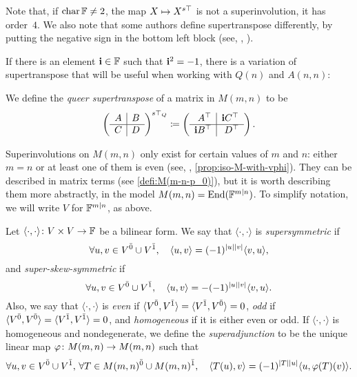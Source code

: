 Note that, if $\operatorname{char} \mathbb{F} \neq 2$, the map $X \mapsto X^{s\top}$ is not a superinvolution, it has order~$4$. 
We also note that some authors define supertranspose differently, by putting the negative sign in the bottom left block (see, \eg, \cite[Subsection 1.1.2]{MR3012224}). 

If there is an element $\mathbf{i}\in \mathbb{F}$ such that $\mathbf{i}^2 = -1$, there is a variation of supertranspose that will be useful when working with $Q(n)$ and $A(n,n)$:

\begin{defi}\label{def:queer-stp}
    We define the \emph{queer supertranspose} of a matrix in $M(m,n)$ to be
    \[
        \left(\begin{array}{c|c}
            A & B\\
            \hline
            C & D
        \end{array}\right)\sTq \coloneqq
        \left(\begin{array}{c|c}
            \phantom{\bi}A\transp & \bi C\transp\\
            \hline
            \bi B\transp & \phantom{\bi} D\transp
        \end{array}\right).
    \]
\end{defi}

Superinvolutions on $M(m,n)$ only exist for certain values of $m$ and $n$: either $m=n$ or at least one of them is even (see, \eg, \cref{prop:iso-M-with-vphi}). 
They can be described in matrix terms (see \cref{defi:M(m-n-p_0)}), but it is worth describing them more abstractly, in the model $M(m,n) = \operatorname{End}(\mathbb{F}^{m|n})$. 
To simplify notation, we will write $V$ for $\mathbb{F}^{m|n}$, as above. 

\begin{defi}
Let $\langle \cdot, \cdot \rangle \colon V\times V \to \mathbb{F}$ be a bilinear form. 
We say that $\langle \cdot, \cdot \rangle$ is  \emph{supersymmetric} if
\[
    \forall u,v \in V^{\bar0} \cup V^{\bar1}, \quad \langle u, v \rangle 
    = (-1)^{|u||v|} \langle v, u \rangle,
\]
and \emph{super-skew-symmetric} if
\[
    \forall u,v \in V^{\bar0} \cup V^{\bar1}, \quad \langle u, v \rangle 
    = -(-1)^{|u||v|} \langle v, u \rangle.
\]
Also, we say that $\langle \cdot, \cdot \rangle$ is \emph{even} if $\langle V^{\bar0}, V^{\bar1} \rangle = \langle V^{\bar1}, V^{\bar0} \rangle = 0$, \emph{odd} if $\langle V^{\bar0}, V^{\bar0} \rangle = \langle V^{\bar1}, V^{\bar1} \rangle = 0$, and \emph{homogeneous} if it is either even or odd. 
If $\langle \cdot, \cdot \rangle$ is homogeneous and nondegenerate, we define the \emph{superadjunction} to be the unique linear map $\varphi\colon M(m,n) \to M(m,n)$ such that 
\[
    \forall u,v \in V^{\bar0} \cup V^{\bar1},\,
    \forall T\in M(m,n)^{\bar0} \cup M(m,n)^{\bar1}, \quad
    \langle T(u), v \rangle = (-1)^{|T||u|} \langle u, \varphi(T)(v) \rangle. 
\]
\end{defi}

